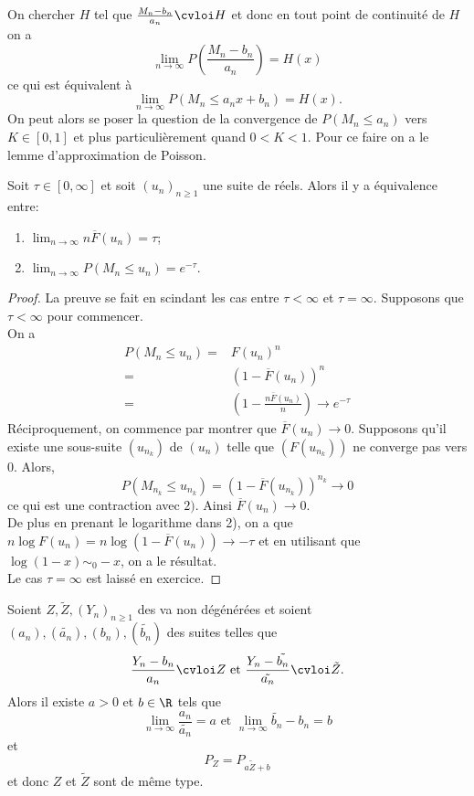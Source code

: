 \documentclass[10p,a4paper,reqno,titlepage]{report}
\begin{document}
On chercher $H$ tel que $ \frac{M_n - b_n}{a_n} \cvloi H$ et donc en tout point de continuité de $H$ on a 
$$ \lim_{n\to \infty} P\left(\frac{M_n -b_n}{a_n}\right)=H(x)$$
ce qui est équivalent à 
$$ \lim_{n\to \infty} P(M_n \leq a_n x +b_n) = H(x).$$
On peut alors se poser la question de la convergence de $P(M_n \leq a_n)$ vers $K \in [0,1]$ et plus particulièrement quand $0 < K < 1.$ Pour ce faire on a le lemme d'approximation de Poisson.
\begin{lemme}
Soit $\tau \in [0,\infty]$ et soit $(u_n)_{n\geq 1}$ une suite de réels. Alors il y a équivalence entre:\
\begin{enumerate}
	\item $ \lim_{n\to\infty} n \overline{F}(u_n) = \tau$;
	\item $\lim_{n \to \infty} P(M_n \leq u_n) = e^{-\tau}.$
\end{enumerate}
\end{lemme}
\begin{proof}
	La preuve se fait en scindant les cas entre $\tau < \infty$ et $\tau=\infty.$ Supposons que $\tau < \infty$ pour commencer. \\
	On a 
	\begin{align*}
		P(M_n \leq u_n) = & F(u_n)^n\\
		=& (1-\overline{F}(u_n))^n \\
		= & \left(1- \frac{n\overline{F}(u_n)}{n}\right) \to e^{-\tau}
	\end{align*}
Réciproquement, on commence par montrer que $\overline{F}(u_n) \to 0$. Supposons qu'il existe une sous-suite $(u_{n_k})$ de $(u_n)$ telle que $(F(u_{n_k}))$ ne converge pas vers $0$. Alors,
$$ P(M_{n_k} \leq u_{n_k}) =\left(1 - \overline{F}(u_{n_k})\right)^{n_k}\to 0 $$
ce qui est une contraction avec $2)$. Ainsi $\overline{F}(u_n) \to 0$. \\
De plus en prenant le logarithme dans 2), on a que $n \log F(u_n) = n \log(1-\overline{F}(u_n)) \to -\tau$ et en utilisant que $\log(1-x) \sim_0 -x$, on a le résultat.\\
Le cas $\tau=\infty$ est laissé en exercice.

\end{proof}
\begin{prop}\label{CTT}
	Soient $Z , \tilde Z , (Y_n)_{n\geq 1}$ des va non dégénérées et soient $(a_n), (\tilde{a_n}),(b_n),(\tilde{b_n})$ des suites telles que 
	$$ \frac{Y_n -b_n}{a_n} \cvloi Z \text{ et } \frac{Y_n-\tilde{b_n}}{\tilde{a_n}} \cvloi \tilde Z.$$
	Alors il existe $a > 0$ et $b \in \R$ tels que 
	$$ \lim_{n\to\infty}\frac{a_n}{\tilde{a_n}} =a \text{ et } \lim_{n\to\infty} \tilde{b_n} - b_n = b$$
	 et 
	 $$P_{Z}= P_{a \tilde Z + b}$$
	et donc $Z $ et $\tilde Z $ sont de même type.
\end{prop}
\end{document}
